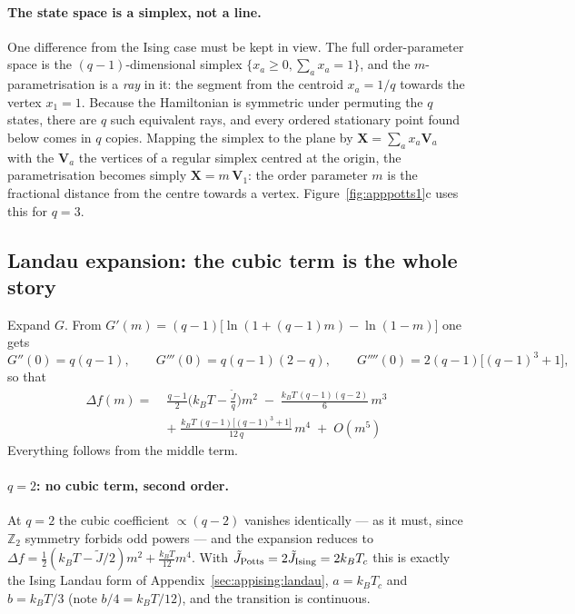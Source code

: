 \documentclass[10pt,a4paper]{article}
\theoremstyle{remark}
\begin{document}
\paragraph{The state space is a simplex, not a line.} One difference from the
Ising case must be kept in view. The full order-parameter space is the
$(q-1)$-dimensional simplex $\{x_a\geq0,\sum_ax_a=1\}$, and the $m$-parametrisation
is a \emph{ray} in it: the segment from the centroid $x_a=1/q$ towards the vertex
$x_1=1$. Because the Hamiltonian is symmetric under permuting the $q$ states,
there are $q$ such equivalent rays, and every ordered stationary point found below
comes in $q$ copies. Mapping the simplex to the plane by
$\mathbf{X}=\sum_ax_a\mathbf{V}_a$ with the $\mathbf{V}_a$ the vertices of a
regular simplex centred at the origin, the parametrisation becomes simply
$\mathbf{X}=m\,\mathbf{V}_1$: the order parameter $m$ is the fractional distance
from the centre towards a vertex. Figure~\ref{fig:apppotts1}c uses this for $q=3$.

\subsection{Landau expansion: the cubic term is the whole story}
\label{sec:apppotts:landau}

Expand $G$. From $G'(m)=(q-1)\big[\ln(1+(q-1)m)-\ln(1-m)\big]$ one gets
\[
G''(0)=q(q-1),\qquad
G'''(0)=q(q-1)(2-q),\qquad
G''''(0)=2(q-1)\big[(q-1)^{3}+1\big],
\]
so that
\[
\;
\begin{aligned}
\Delta f(m)=\;&\frac{q-1}{2}\Big(k_BT-\frac{\tilde J}{q}\Big)m^{2}
\;-\;\frac{k_BT\,(q-1)(q-2)}{6}\,m^{3}\\[2pt]
&+\;\frac{k_BT\,(q-1)\big[(q-1)^{3}+1\big]}{12\,q}\,m^{4}\;+\;O(m^{5})
\end{aligned}\
\]
Everything follows from the middle term.

\paragraph{$q=2$: no cubic term, second order.} At $q=2$ the cubic coefficient
$\propto(q-2)$ vanishes identically --- as it must, since $\mathbb{Z}_2$ symmetry
forbids odd powers --- and the expansion reduces to
$\Delta f=\tfrac12(k_BT-\tilde J/2)m^{2}+\tfrac{k_BT}{12}m^{4}$. With
$\tilde J_{\rm Potts}=2\tilde J_{\rm Ising}=2k_BT_c$ this is exactly the Ising
Landau form of Appendix~\ref{sec:appising:landau}, $a=k_BT_c$ and
$b=k_BT/3$ (note $b/4=k_BT/12$), and the transition is continuous.
\end{document}
